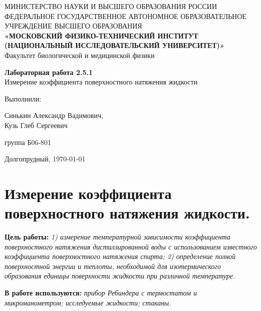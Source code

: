 \documentclass[a4paper,12pt]{article} %
\theoremstyle{plain} %
\theoremstyle{definition} %
\theoremstyle{remark} %
\begin{document}
 
\begin{center}
\hfill \break
{МИНИСТЕРСТВО НАУКИ И ВЫСШЕГО ОБРАЗОВАНИЯ РОССИИ}\\
\footnotesize{ФЕДЕРАЛЬНОЕ ГОСУДАРСТВЕННОЕ АВТОНОМНОЕ ОБРАЗОВАТЕЛЬНОЕ}\\ 
\footnotesize{УЧРЕЖДЕНИЕ ВЫСШЕГО ОБРАЗОВАНИЯ}\\
\small{\textbf{«МОСКОВСКИЙ ФИЗИКО-ТЕХНИЧЕСКИЙ ИНСТИТУТ (НАЦИОНАЛЬНЫЙ ИССЛЕДОВАТЕЛЬСКИЙ УНИВЕРСИТЕТ)»}}\\
\hfill \break
\normalsize{Факультет биологической и медицинской физики}\\
\hfill \break

\hfill \break
\hfill \break
\hfill \break
\hfill\break
\hfill\break
\large\textbf{{Лабораторная работа 2.5.1}}\\
\large{Измерение коэффициента поверхностного натяжения жидкости}\\
\hfill \break
\hfill \break
\end{center}
 
\begin{flushright}
{Выполнили:}

{Синькин Александр Вадимович,\\ Кузь Глеб Сергеевич}

{группа Б06-801}
\end{flushright}

\hfill \break
\begin{center} Долгопрудный,  \today \end{center}
\thispagestyle{empty} %
 

\newpage

\section*{Измерение коэффициента поверхностного натяжения жидкости.}

\textbf{Цель работы:} \textit{1) измерение температурной зависимости  коэффициента поверхностного натяжения дистиллированной воды с использованием известного коэффициента поверхностного натяжения спирта;  2) определение полной поверхностной энергии  и теплоты, необходимой для изотермического образования единицы  поверхности жидкости  при различной температуре. }

\textbf{В работе используются:} \textit{ прибор  Ребиндера  с термостатом и микроманометром; исследуемые жидкости; стаканы.}
\end{document}
